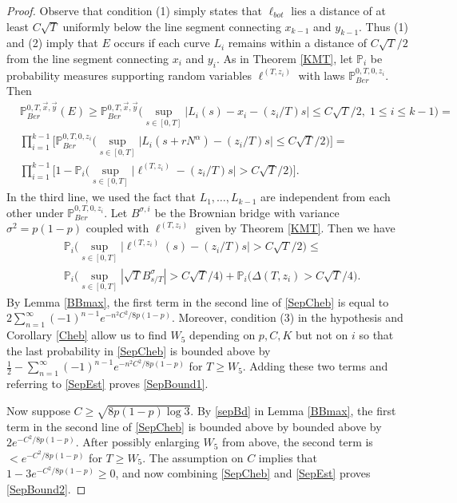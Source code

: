 \begin{proof}
	Observe that condition (1) simply states that $\ell_{bot}$ lies a distance of at least $C\sqrt{T}$ uniformly below the line segment connecting $x_{k-1}$ and $y_{k-1}$. Thus (1) and (2) imply that $E$ occurs if each curve $L_i$ remains within a distance of $C\sqrt{T}/2$ from the line segment connecting $x_i$ and $y_i$. As in Theorem \ref{KMT}, let $\mathbb{P}_i$ be probability measures supporting random variables $\ell^{(T,z_i)}$ with laws $\mathbb{P}^{0,T,0,z_i}_{Ber}$. Then
	\begin{equation}\label{SepEst}
	\begin{split}
	& \mathbb{P}^{0, T,\vec{x},\vec{y}}_{Ber} (E) \geq \mathbb{P}^{0,T,\vec{x},\vec{y}}_{Ber} \Big(\sup_{s\in[0,T]} \big|L_i(s) - x_i - (z_i/T)s\big| \leq C\sqrt{T}/2, \;1\leq i\leq k-1\Big) =\\
	&\prod_{i=1}^{k-1}\Big[ \mathbb{P}^{0,T,0,z_i}_{Ber} \Big(\sup_{s\in[0,T]} \big|L_i(s+rN^\alpha) - (z_i/T)s\big| \leq C\sqrt{T}/2\Big)\Big] =\\
	&\prod_{i=1}^{k-1}\Big[ 1 - \mathbb{P}_i\Big(\sup_{s\in[0,T]} \big|\ell^{(T,z_i)} - (z_i/T)s\big| > C\sqrt{T}/2\Big)\Big]. \end{split}
	\end{equation}
	In the third line, we used the fact that $L_1,\dots,L_{k-1}$ are independent from each other under $\mathbb{P}^{0,T,0,z_i}_{Ber}$. Let $B^{\sigma,i}$ be the Brownian bridge with variance $\sigma^2 = p(1-p)$ coupled with $\ell^{(T,z_i)}$ given by Theorem \ref{KMT}. Then we have
	\begin{equation}\label{SepCheb}
	\begin{split}
	&\mathbb{P}_i \Big(\sup_{s\in[0,T]} \big|\ell^{(T,z_i)}(s) - (z_i/T)s\big| > C\sqrt{T}/2\Big) \leq \\
	& \mathbb{P}_i\Big(\sup_{s\in[0,T]} |\sqrt{T}B^{\sigma}_{s/T}| > C\sqrt{T}/4\Big) + \mathbb{P}_i\Big(\Delta(T,z_i) > C\sqrt{T}/4\Big).
	\end{split}
	\end{equation}
	By Lemma \ref{BBmax}, the first term in the second line of \eqref{SepCheb} is equal to $2\sum_{n=1}^\infty (-1)^{n-1} e^{-n^2C^2/8p(1-p)}$. Moreover, condition (3) in the hypothesis and Corollary \ref{Cheb} allow us to find $W_5$ depending on $p,C,K$ but not on $i$ so that the last probability in \eqref{SepCheb} is bounded above by $\frac{1}{2} - \sum_{n=1}^\infty (-1)^{n-1} e^{-n^2C^2/8p(1-p)}$ for $T\geq W_5$. Adding these two terms and referring to \eqref{SepEst} proves \eqref{SepBound1}.
	
	Now suppose $C\geq\sqrt{8p(1-p)\log 3}$. By \eqref{sepBd} in Lemma \ref{BBmax}, the first term in the second line of \eqref{SepCheb} is bounded above by bounded above by $2e^{-C^2/8p(1-p)}$. After possibly enlarging $W_5$ from above, the second term is $<e^{-C^2/8p(1-p)}$ for $T\geq W_5$. The assumption on $C$ implies that $1-3e^{-C^2/8p(1-p)}\geq 0$, and now combining \eqref{SepCheb} and \eqref{SepEst} proves \eqref{SepBound2}.
\end{proof}


